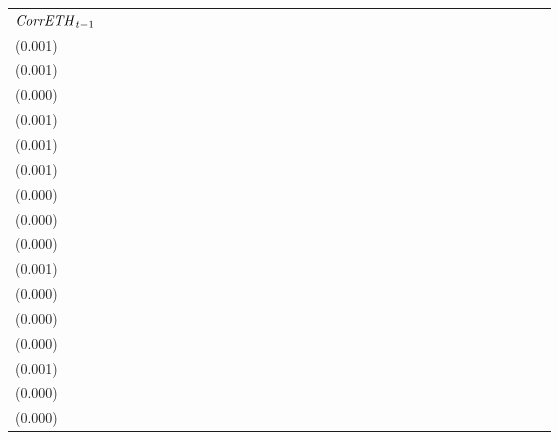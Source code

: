 \begin{tabular}{lllllllllllllllllllllllllllllllll}
${{\it CorrETH}}_{t-1}$      &  \makecell{$-0.003^{**}$ \\(0.001)} &                                     &  \makecell{$-0.027^{**}$ \\(0.001)} &                                     &     \makecell{$0.000^{}$ \\(0.000)} &                                     &  \makecell{$-0.004^{**}$ \\(0.001)} &                                    &  \makecell{$-0.004^{**}$ \\(0.001)} &                                     &    \makecell{$-0.000^{}$ \\(0.001)} &                                     &    \makecell{$-0.000^{}$ \\(0.000)} &                                     &     \makecell{$0.000^{}$ \\(0.000)} &                                     &  \makecell{$-0.003^{**}$ \\(0.000)} &                                     &    \makecell{$-0.001^{}$ \\(0.001)} &                                     &    \makecell{$-0.000^{}$ \\(0.000)} &                                     &    \makecell{$-0.000^{}$ \\(0.000)} &                                     &  \makecell{$-0.002^{**}$ \\(0.000)} &                                     &  \makecell{$-0.004^{**}$ \\(0.001)} &                                    &    \makecell{$0.000^{}$ \\(0.000)} &                                    &   \makecell{$-0.000^{}$ \\(0.000)} &                                    \\

\end{tabular}
